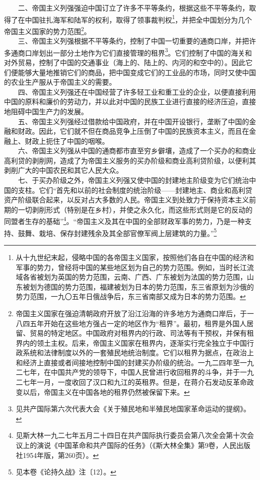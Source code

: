 \documentclass[cn,11pt,chinese]{elegantbook}
\begin{document}
　　二、帝国主义列强强迫中国订立了许多不平等条约，根据这些不平等条约，取得了在中国驻扎海军和陆军的权利，取得了领事裁判权\footnote[22]{ 从十九世纪末起，侵略中国的各帝国主义国家，按照他们各自在中国的经济和军事的势力，曾经将中国的某些地区划为自己的势力范围。例如，当时长江流域各省被划为英国的势力范围，云南、广西、广东被划为法国的势力范围，山东被划为德国的势力范围，福建被划为日本的势力范围，东三省原划为沙俄的势力范围，一九〇五年日俄战争后，东三省南部又成为日本的势力范围。}，并把全中国划分为几个帝国主义国家的势力范围\footnote[23]{ 帝国主义国家在强迫清朝政府开放了沿江沿海的许多地方为通商口岸后，于一八四五年开始在这些地方强占一定的地区作为“租界”。最初，租界是外国人居留、贸易的特定地区。中国政府对租界内的行政、司法等有干预权，并保有租界内的领土主权。后来，帝国主义国家在租界内，逐渐实行完全独立于中国行政系统和法律制度以外的一套殖民地统治制度。它们以租界为据点，在政治上和经济上直接或者间接地控制中国的封建买办阶级的统治。一九二四年至一九二七年，在中国共产党的领导下，中国人民曾进行收回租界的斗争，并于一九二七年一月，一度收回了汉口和九江的英租界。但是，在蒋介石发动反革命政变以后，帝国主义在中国各地的租界仍然被保留下来。}。\\
　　三、帝国主义列强根据不平等条约，控制了中国一切重要的通商口岸，并把许多通商口岸划出一部分土地作为它们直接管理的租界\footnote[24]{ 见共产国际第六次代表大会《关于殖民地和半殖民地国家革命运动的提纲》。}。它们控制了中国的海关和对外贸易，控制了中国的交通事业（海上的、陆上的、内河的和空中的）。因此它们便能够大量地推销它们的商品，把中国变成它们的工业品的市场，同时又使中国的农业生产服从于帝国主义的需要。\\
　　四、帝国主义列强还在中国经营了许多轻工业和重工业的企业，以便直接利用中国的原料和廉价的劳动力，并以此对中国的民族工业进行直接的经济压迫，直接地阻碍中国生产力的发展。\\
　　五、帝国主义列强经过借款给中国政府，并在中国开设银行，垄断了中国的金融和财政。因此，它们就不但在商品竞争上压倒了中国的民族资本主义，而且在金融上、财政上扼住了中国的咽喉。\\
　　六、帝国主义列强从中国的通商都市直至穷乡僻壤，造成了一个买办的和商业高利贷的剥削网，造成了为帝国主义服务的买办阶级和商业高利贷阶级，以便利其剥削广大的中国农民和其它人民大众。\\
　　七、于买办阶级之外，帝国主义列强又使中国的封建地主阶级变为它们统治中国的支柱。它们“首先和以前的社会制度的统治阶级——封建地主、商业和高利贷资产阶级联合起来，以反对占大多数的人民。帝国主义到处致力于保持资本主义前期的一切剥削形式（特别是在乡村），并使之永久化，而这些形式则是它的反动的同盟者生存的基础”\footnote[25]{ 见斯大林一九二七年五月二十四日在共产国际执行委员会第八次全会第十次会议上的演说《中国革命和共产国际的任务》（《斯大林全集》第9卷，人民出版社1954年版，第260页）。}。“帝国主义及其在中国的全部财政军事的势力，乃是一种支持、鼓舞、栽培、保存封建残余及其全部官僚军阀上层建筑的力量。”\footnote[26]{ 见本卷《论持久战》注〔12〕。}\\
\end{document}
